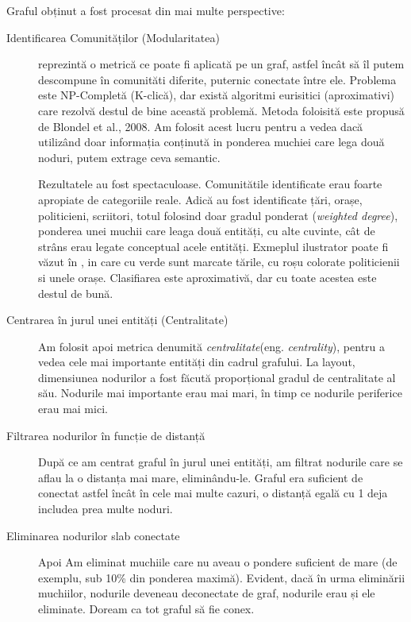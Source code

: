 Graful obținut a fost procesat din mai multe perspective:

\begin{description}

\item[Identificarea Comunităților (Modularitatea)] reprezintă o metrică ce poate fi aplicată pe un graf, astfel încât să îl putem descompune în comunităti diferite, puternic conectate între ele. Problema este NP-Completă (K-clică), dar există algoritmi eurisitici (aproximativi) care rezolvă destul de bine această problemă. Metoda foloisită este propusă de Blondel et al., 2008.\cite{Blondel08fastunfolding} Am folosit acest lucru pentru a vedea dacă utilizând doar informația conținută in ponderea muchiei care lega două noduri, putem extrage ceva semantic.

 Rezultatele au fost spectaculoase. Comunitătile identificate erau foarte apropiate de categoriile reale. Adică au fost identificate țări, orașe, politicieni, scriitori, totul folosind doar gradul ponderat (\textit{weighted degree}), ponderea unei muchii care leaga două entități, cu alte cuvinte, cât de strâns erau legate conceptual acele entități. Exmeplul ilustrator poate fi văzut în , in care cu verde sunt marcate tările, cu roșu colorate politicienii si unele orașe. Clasifiarea este aproximativă, dar cu toate acestea este destul de bună.
 

 \item[Centrarea în jurul unei entități (Centralitate)] Am folosit apoi metrica denumită \textit{centralitate}(eng. \textit{centrality}), pentru a vedea cele mai importante entități din cadrul grafului. La layout, dimensiunea nodurilor a fost făcută proporțional gradul de centralitate al său. Nodurile mai importante erau mai mari, în timp ce nodurile periferice erau mai mici.
 
 \item[Filtrarea nodurilor în funcție de distanță] După ce am centrat graful în jurul unei entități, am filtrat nodurile care se aflau la o distanța mai mare, eliminându-le. Graful era suficient de conectat astfel încât în cele mai multe cazuri, o distanță egală cu 1 deja includea prea multe noduri.
 
 \item[Eliminarea nodurilor slab conectate] Apoi Am eliminat muchiile care nu aveau o pondere suficient de mare (de exemplu, sub 10\% din ponderea maximă). Evident, dacă în urma eliminării muchiilor, nodurile deveneau deconectate de graf, nodurile erau și ele eliminate. Doream ca tot graful să fie conex.
 

\end{description}
